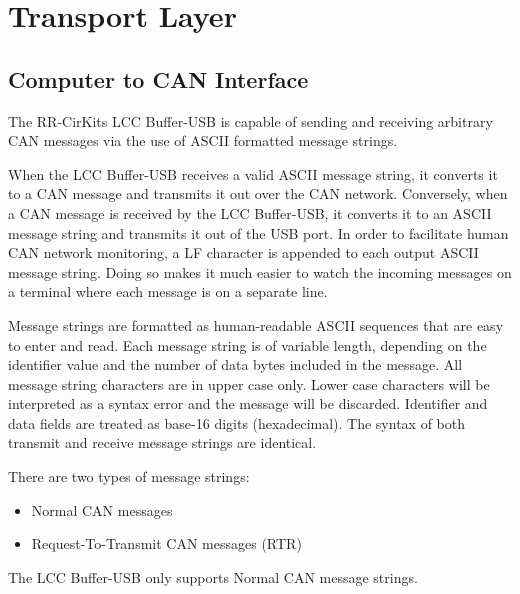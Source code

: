  

\chapter[Transport Layer]{Transport Layer}

\section{Computer to CAN Interface}

The RR-CirKits LCC Buffer-USB is capable of sending and receiving arbitrary CAN messages via the use of ASCII formatted message strings.

When the LCC Buffer-USB receives a valid ASCII message string, it converts it to a CAN message and transmits it out over the CAN network. Conversely, when a CAN message is received by the LCC Buffer-USB, it converts it to an ASCII message string and transmits it out of the USB port. In order to facilitate human CAN network monitoring,  a LF character is appended to each output ASCII message string. Doing so makes it much easier to watch the incoming messages on a terminal where each message is on a separate line. 

Message strings are formatted as human-readable ASCII sequences that are easy to enter and read. Each message string is of variable length, depending on the identifier value and the number of data bytes included in the message. All message string characters are in upper case only. Lower case characters will be interpreted as a syntax error and the message will be discarded. Identifier and data fields are treated as base-16 digits (hexadecimal). The syntax of both transmit and receive message strings are identical.

There are two types of message strings:

\begin{itemize}
\item Normal CAN messages
\item Request-To-Transmit CAN messages (RTR)
\end{itemize}

The LCC Buffer-USB only supports Normal CAN message strings.

